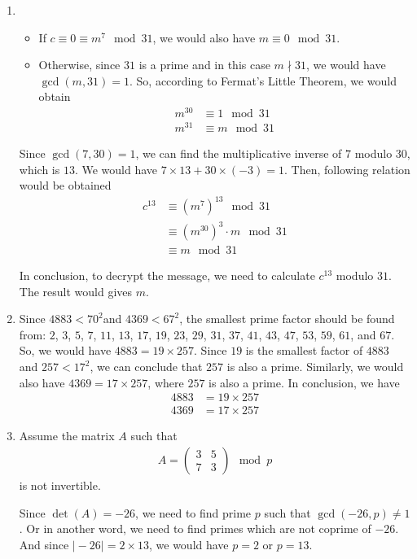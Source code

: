 \documentclass[11pt,a4paper]{article}
\begin{document}
\begin{enumerate}
	\item
		\begin{itemize}
			\item If $c \equiv 0 \equiv m^{7} \mod 31$, we would also have $m \equiv 0 \mod 31$.
			\item Otherwise, since $31$ is a prime and in this case $m \nmid 31$, we would have $\gcd(m, 31) = 1$. So, according to Fermat's Little Theorem, we would obtain
				\begin{align*}
					m^{30} &\equiv 1 \mod 31 \\
					m^{31} &\equiv m \mod 31
				\end{align*}
		\end{itemize}
	\par Since $\gcd(7, 30) = 1$, we can find the multiplicative inverse of $7$ modulo $30$, which is $13$. We would have $7 \times 13 + 30 \times (-3) = 1$. Then, following relation would be obtained
		\begin{align*}
			c^{13} &\equiv (m^{7})^{13} \mod 31 \\
			&\equiv (m^{30})^{3} \cdot m \mod 31 \\
			&\equiv m \mod 31
		\end{align*}
	\par In conclusion, to decrypt the message, we need to calculate $c^{13}$ modulo $31$. The result would gives $m$.
	
	\item Since $4883 < 70^{2}$and $4369 < 67^{2}$, the smallest prime factor should be found from: $2$, $3$, $5$, $7$, $11$, $13$, $17$, $19$, $23$, $29$, $31$, $37$, $41$, $43$, $47$, $53$, $59$, $61$, and $67$. So, we would have $4883 = 19 \times 257$. Since $19$ is the smallest factor of $4883$ and $257 < 17^{2}$, we can conclude that $257$ is also a prime. Similarly, we would also have $4369 = 17 \times 257$, where $257$ is also a prime. In conclusion, we have
		\begin{align*}
			4883 &= 19 \times 257 \\
			4369 &= 17 \times 257
		\end{align*}
		
	\item Assume the matrix $A$ such that
		\begin{align*}
			A = \begin{pmatrix} 3 & 5 \\ 7 & 3 \end{pmatrix} \mod p
		\end{align*}
		is not invertible.
	\par Since $\det(A) = -26$, we need to find prime $p$ such that $\gcd(-26, p) \neq 1$. Or in another word, we need to find primes which are not coprime of $-26$. And since $\vert -26 \vert = 2 \times 13$, we would have $p = 2$ or $p = 13$.
	

\end{enumerate}
\end{document}
